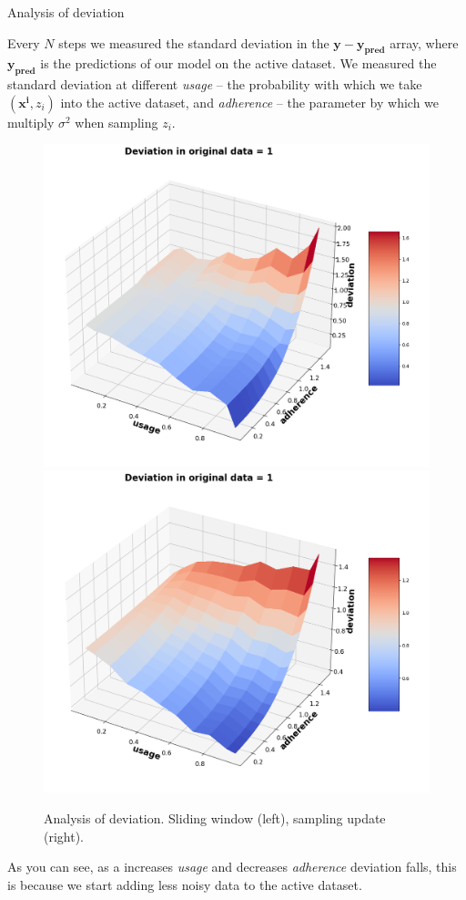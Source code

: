 \documentclass[aspectratio=169]{beamer}
\begin{document}
    \begin{frame}{Analysis of deviation}
        
        \footnotesize
        Every $N$ steps we measured the standard deviation in the $\mathbf{y} - \mathbf{y_{\text{pred}}}$ array, where $\mathbf{y_{\text{pred}}}$ is the predictions of our model on the active dataset. We measured the standard deviation at different \textit{usage} -- the probability with which we take $(\mathbf{x^i}, z_i)$ into the active dataset, and \textit{adherence} -- the parameter by which we multiply $\sigma^2$ when sampling $z_i$. 
        
        \begin{figure}[h!]
            \centering
            \includegraphics[width=0.3\linewidth]{pictures/3D_plot_loop_1.png}
            \includegraphics[width=0.3\linewidth]{pictures/3D_plot_sample_1.png}
            
            \caption{Analysis of deviation. Sliding window (left), sampling update (right).}
            \label{3D}
        \end{figure}

        As you can see, as a increases \textit{usage} and decreases \textit{adherence} deviation falls, this is because we start adding less noisy data to the active dataset.
        
    \end{frame}
\end{document}

